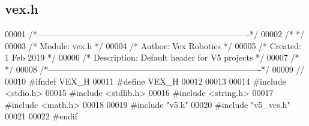 \hypertarget{vex_8h_source}{}\subsection{vex.\+h}
\label{vex_8h_source}

\begin{DoxyCode}
00001 \textcolor{comment}{/*----------------------------------------------------------------------------*/}
00002 \textcolor{comment}{/*                                                                            */}
00003 \textcolor{comment}{/*    Module:       vex.h                                                     */}
00004 \textcolor{comment}{/*    Author:       Vex Robotics                                              */}
00005 \textcolor{comment}{/*    Created:      1 Feb 2019                                                */}
00006 \textcolor{comment}{/*    Description:  Default header for V5 projects                            */}
00007 \textcolor{comment}{/*                                                                            */}
00008 \textcolor{comment}{/*----------------------------------------------------------------------------*/}
00009 \textcolor{comment}{//}
00010 \textcolor{preprocessor}{#ifndef VEX\_H}
00011 \textcolor{preprocessor}{#define VEX\_H}
00012 
00013 
00014 \textcolor{preprocessor}{#include <stdio.h>}
00015 \textcolor{preprocessor}{#include <stdlib.h>}
00016 \textcolor{preprocessor}{#include <string.h>}
00017 \textcolor{preprocessor}{#include <math.h>}
00018 
00019 \textcolor{preprocessor}{#include "v5.h"}
00020 \textcolor{preprocessor}{#include "v5\_vcs.h"}
00021 
00022 \textcolor{preprocessor}{#endif}
\end{DoxyCode}
